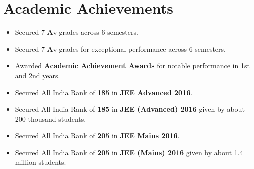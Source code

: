 \section*{Academic Achievements}
\begin{itemize}

\setlength\itemsep{0pt}
\item Secured 7 \textbf{A$\star$} grades across 6 semesters.
\item Secured 7 \textbf{A$\star$} grades for exceptional performance across 6 semesters.
\item Awarded \textbf{Academic Achievement Awards} for notable performance in 1st and 2nd years.
\item Secured All India Rank of {\bf 185} in {\bf JEE Advanced 2016}.
\item Secured All India Rank of {\bf 185} in {\bf JEE (Advanced) 2016} given by about 200 thousand students.
\item Secured All India Rank of {\bf 205} in {\bf JEE Mains 2016}.
\item Secured All India Rank of {\bf 205} in {\bf JEE (Mains) 2016} given by about 1.4 million students.

\end{itemize}
